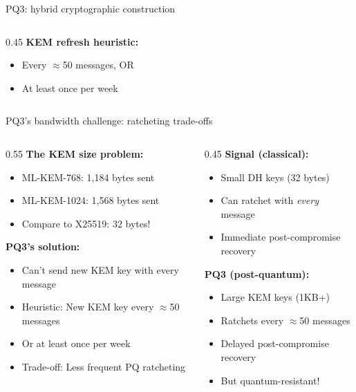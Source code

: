\ifdefined\PRESENTATION\else\PassOptionsToClass{handout}{beamer}\fi\documentclass[aspectratio=169, lualatex]{beamer}
\begin{document}
\begin{frame}{PQ3: hybrid cryptographic construction}
\begin{columns}[c]
\begin{column}{0.45\textwidth}
			\textbf{KEM refresh heuristic:}
			\begin{itemize}
				\item Every $\approx$50 messages, OR
				\item At least once per week
			\end{itemize}
		\end{column}
	\end{columns}
\end{frame}

\begin{frame}{PQ3's bandwidth challenge: ratcheting trade-offs}
	\begin{columns}[c]
		\begin{column}{0.55\textwidth}
			\textbf{The KEM size problem:}
			\begin{itemize}
				\item ML-KEM-768: 1,184 bytes sent
				\item ML-KEM-1024: 1,568 bytes sent
				\item Compare to X25519: 32 bytes!
			\end{itemize}
			\textbf{PQ3's solution:}
			\begin{itemize}
				\item Can't send new KEM key with every message
				\item Heuristic: New KEM key every $\approx$50 messages
				\item Or at least once per week
				\item Trade-off: Less frequent PQ ratcheting
			\end{itemize}
		\end{column}
		\begin{column}{0.45\textwidth}
			\textbf{Signal (classical):}
			\begin{itemize}
				\item Small DH keys (32 bytes)
				\item Can ratchet with \textit{every} message
				\item Immediate post-compromise recovery
			\end{itemize}
			\textbf{PQ3 (post-quantum):}
			\begin{itemize}
				\item Large KEM keys (1KB+)
				\item Ratchets every $\approx$50 messages
				\item Delayed post-compromise recovery
				\item But quantum-resistant!
			\end{itemize}
		\end{column}
	\end{columns}
\end{frame}
\end{document}
